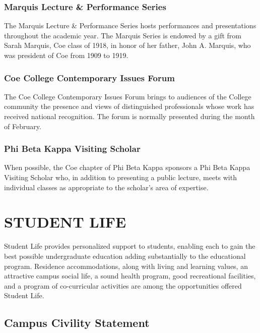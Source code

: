 \documentclass[
  letterpaper,
]{scrbook}
\begin{document}
\subsection{Marquis Lecture \& Performance
Series}\label{marquis-lecture-performance-series}

The Marquis Lecture \& Performance Series hosts performances and
presentations throughout the academic year. The Marquis Series is
endowed by a gift from Sarah Marquis, Coe class of 1918, in honor of her
father, John A. Marquis, who was president of Coe from 1909 to 1919.

\subsection{Coe College Contemporary Issues
Forum}\label{coe-college-contemporary-issues-forum}

The Coe College Contemporary Issues Forum brings to audiences of the
College community the presence and views of distinguished professionals
whose work has received national recognition. The forum is normally
presented during the month of February.

\subsection{Phi Beta Kappa Visiting
Scholar}\label{phi-beta-kappa-visiting-scholar}

When possible, the Coe chapter of Phi Beta Kappa sponsors a Phi Beta
Kappa Visiting Scholar who, in addition to presenting a public lecture,
meets with individual classes as appropriate to the scholar's area of
expertise.

\chapter{STUDENT LIFE}\label{student-life}

Student Life provides personalized support to students, enabling each to
gain the best possible undergraduate education adding substantially to
the educational program. Residence accommodations, along with living and
learning values, an attractive campus social life, a sound health
program, good recreational facilities, and a program of co-curricular
activities are among the opportunities offered Student Life.

\section{Campus Civility Statement}\label{campus-civility-statement}
\end{document}
